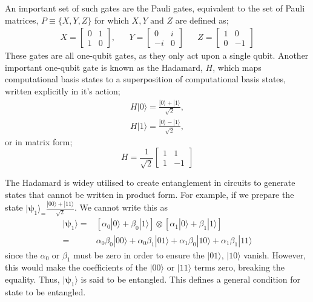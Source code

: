 An important set of such gates are the Pauli gates, equivalent 
to the set of Pauli matrices, $P \equiv \{X, Y, Z\}$ for which $X, Y \text{ and } Z$ are defined as;
\begin{align*}
    X = \begin{bmatrix}
            0 & 1 \\
            1 & 0
        \end{bmatrix},
     &  &
    Y = \begin{bmatrix}
            0  & i \\
            -i & 0
        \end{bmatrix}
     &  &
    Z = \begin{bmatrix}
            1 & 0  \\
            0 & -1
        \end{bmatrix}
\end{align*}
These gates are all one-qubit gates, as they only act upon a single qubit. Another important one-qubit gate is
known as the Hadamard, $H$, which maps computational basis states to a superposition of computational basis states,
written explicitly in it's action;
\begin{align*}
    H |0\rangle = \frac{|0\rangle + |1\rangle}{\sqrt{2}}, \\
    H |1\rangle = \frac{|0\rangle - |1\rangle}{\sqrt{2}},
\end{align*}
or in matrix form;
\begin{equation*}
    H = \frac{1}{\sqrt{2}} \begin{bmatrix}
        1 & 1  \\
        1 & -1
    \end{bmatrix}
\end{equation*}

The Hadamard is widey utilised to create entanglement in circuits to generate states that cannot be written in product form. For example, if we prepare the state
$|{\bm\psi}_1\rangle_ = \frac{|00\rangle + |11\rangle}{\sqrt{2}}$. We cannot write this as 
\begin{align*}
    |{\bm\psi}_1\rangle =& \left[ \alpha_0 |0\rangle + \beta_0|1\rangle\right] \otimes \left[\alpha_1 |0\rangle + \beta_1|1\rangle\right] \\
    =& \alpha_0\beta_0 |00\rangle + \alpha_0\beta_1|01\rangle + \alpha_1\beta_0|10\rangle + \alpha_1\beta_1|11\rangle
\end{align*}
since the $\alpha_0$ or $\beta_1$ must be zero in order to ensure the $|01\rangle$, $|10\rangle$ vanish. However, this would make the coefficients of the $|00\rangle$ 
or $|11\rangle$ terms zero, breaking the equality. Thus, $|{\bm\psi}_1\rangle$ is said to be entangled. This defines a general condition for state to be entangled.







